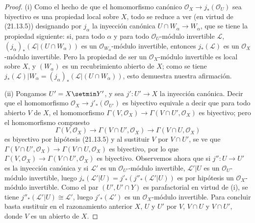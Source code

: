 \begin{proof}
(i) Como el hecho de que el homomorfismo canónico
$\mathcal O_X\to j_*(\mathcal O_U)$ sea biyectivo es una propiedad local sobre $X$,
todo se reduce a ver (en virtud de (21.13.5)) designando por
$j_\alpha$ la inyección canónica $U\cap W_\alpha\to W_\alpha$, que se tiene la propiedad
siguiente: si, para todo $\alpha$ y para todo $\mathcal O_U$-módulo invertible
$\mathscr L$, $(j_\alpha)_*(\mathscr L|(U\cap W_\alpha))$ es un
$\mathcal O_{W_\alpha}$-módulo invertible, entonces $j_*(\mathscr L)$ es un
$\mathcal O_X$-módulo invertible. Pero la propiedad de ser un $\mathcal O_X$-módulo
invertible es local sobre $X$, y $(W_\alpha)$ es un recubrimiento abierto de $X$;
como se tiene
$j_*(\mathscr L)|W_\alpha=(j_\alpha)_*(\mathscr L|(U\cap W_\alpha))$,
esto demuestra nuestra afirmación.

(ii) Pongamos $U'=X\setmin Y'$, y sea $j':U'\to X$ la inyección canónica. Decir que
el homomorfismo $\mathcal O_X\to j'_*(\mathcal O_{U'})$ es biyectivo equivale a decir
que para todo abierto $V$ de $X$, el homomorfismo
$\Gamma(V,\mathcal O_X)\to\Gamma(V\cap U',\mathcal O_X)$ es biyectivo; pero
el homomorfismo compuesto
\[
  \Gamma(V,\mathcal O_X)\longrightarrow\Gamma(V\cap U',\mathcal O_X)
  \longrightarrow\Gamma(V\cap U,\mathcal O_X)
\]
es biyectivo por hipótesis (21.13.5) y al sustituir $V$ por $V\cap U'$, se ve que
$\Gamma(V\cap U',\mathcal O_X)\to\Gamma(V\cap U,\mathcal O_X)$ es biyectivo, por lo que
$\Gamma(V,\mathcal O_X)\to\Gamma(V\cap U',\mathcal O_X)$ es biyectivo. Observemos ahora
que si $j'':U\to U'$ es la inyección canónica y si $\mathscr L'$ es un
$\mathcal O_{U'}$-módulo invertible, $\mathscr L'|U$ es un $\mathcal O_U$-módulo
invertible, luego
$j_*(\mathscr L'|U)=j'_*(j''_*(\mathscr L'|U))$ es por hipótesis un
$\mathcal O_X$-módulo invertible. Como el par $(U',U'\cap Y)$ es parafactorial
en virtud de (i), se tiene $j''_*(\mathscr L'|U)\cong\mathscr L'$, luego
$j'_*(\mathscr L')$ es un $\mathcal O_X$-módulo invertible. Para concluir basta
sustituir en el razonamiento anterior $X$, $U$ y $U'$ por $V$,
$V\cap U$ y $V\cap U'$, donde $V$ es un abierto de $X$.


\end{proof}
